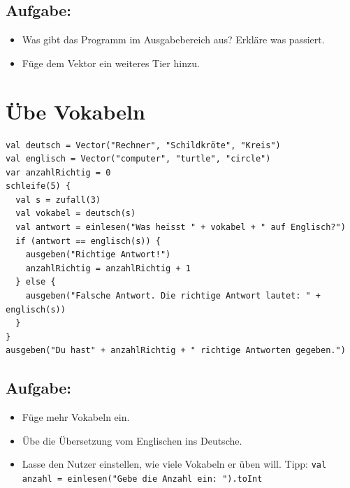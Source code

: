 \section*{\color{BrickRed}Aufgabe:}


\begin{itemize}

\item {Was gibt das Programm im Ausgabebereich aus? Erkläre was passiert.}
\item {Füge dem Vektor ein weiteres Tier hinzu.}

\end{itemize}


\chapter{Übe Vokabeln}
\begin{lstlisting}[basicstyle={\ttfamily\fontsize{14}{17}\selectfont},numbers=none]
val deutsch = Vector("Rechner", "Schildkröte", "Kreis")
val englisch = Vector("computer", "turtle", "circle")
var anzahlRichtig = 0
schleife(5) {
  val s = zufall(3)
  val vokabel = deutsch(s)
  val antwort = einlesen("Was heisst " + vokabel + " auf Englisch?")
  if (antwort == englisch(s)) {
    ausgeben("Richtige Antwort!")
    anzahlRichtig = anzahlRichtig + 1
  } else {
    ausgeben("Falsche Antwort. Die richtige Antwort lautet: " + englisch(s))
  }
}
ausgeben("Du hast" + anzahlRichtig + " richtige Antworten gegeben.")
\end{lstlisting}
        
\section*{\color{BrickRed}Aufgabe:}


\begin{itemize}

\item {Füge mehr Vokabeln ein.}
\item {Übe die Übersetzung vom Englischen ins Deutsche.}
\item {Lasse den Nutzer einstellen, wie viele Vokabeln er üben will. Tipp: \lstinline{val anzahl = einlesen("Gebe die Anzahl ein: ").toInt}}

\end{itemize}



